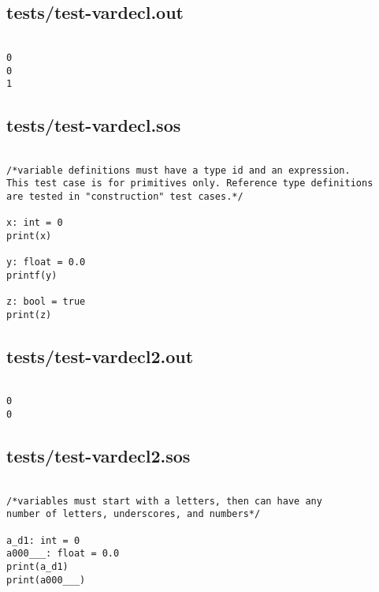 \documentclass[main.tex]{subfiles}
\begin{document}
\subsection{tests/test-vardecl.out}

\begin{lstlisting}

0
0
1
\end{lstlisting}

\subsection{tests/test-vardecl.sos}

\begin{lstlisting}

/*variable definitions must have a type id and an expression.
This test case is for primitives only. Reference type definitions
are tested in "construction" test cases.*/

x: int = 0
print(x)

y: float = 0.0
printf(y)

z: bool = true
print(z)
\end{lstlisting}

\subsection{tests/test-vardecl2.out}

\begin{lstlisting}

0
0
\end{lstlisting}

\subsection{tests/test-vardecl2.sos}

\begin{lstlisting}

/*variables must start with a letters, then can have any
number of letters, underscores, and numbers*/

a_d1: int = 0
a000___: float = 0.0
print(a_d1)
print(a000___)
\end{lstlisting}
\end{document}
